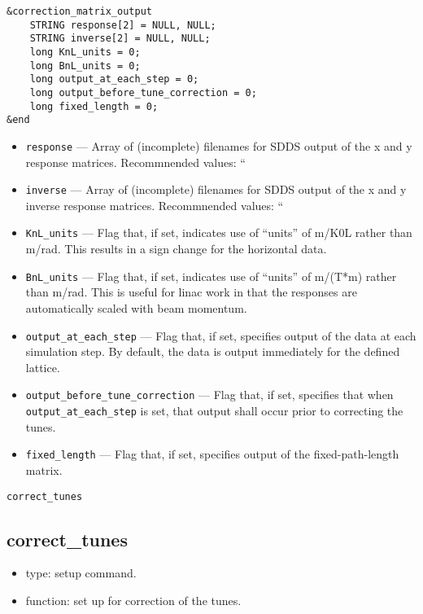 \documentclass[11pt]{article}
\begin{document}
\begin{verbatim}
&correction_matrix_output
    STRING response[2] = NULL, NULL;
    STRING inverse[2] = NULL, NULL;
    long KnL_units = 0;
    long BnL_units = 0;
    long output_at_each_step = 0;
    long output_before_tune_correction = 0;
    long fixed_length = 0;
&end
\end{verbatim}

\begin{itemize}
\item \verb|response| --- Array of (incomplete) filenames for SDDS output of the x and y response
matrices.  Recommnended values: ``%
\item \verb|inverse| --- Array of (incomplete) filenames for SDDS output of the x and y 
inverse response matrices. Recommnended values: ``%
\item \verb|KnL_units| --- Flag that, if set, indicates use of ``units'' of m/K0L rather than
m/rad.  This results in a sign change for the horizontal data.
\item \verb|BnL_units| --- Flag that, if set, indicates use of ``units'' of m/(T*m) rather than
m/rad.  This is useful for linac work in that the responses are automatically scaled with 
beam momentum.
\item \verb|output_at_each_step| --- Flag that, if set, specifies output of the data at
each simulation step.  By default, the data is output immediately for the defined lattice.
\item \verb|output_before_tune_correction| --- Flag that, if set, specifies that when 
\verb|output_at_each_step| is set, that output shall occur prior to correcting the tunes.
\item \verb|fixed_length| --- Flag that, if set, specifies output of the fixed-path-length
matrix.
\end{itemize}

\begin{latexonly}
\newpage
\begin{center}{\Large\verb|correct_tunes|}\end{center}
\end{latexonly}
\subsection{correct\_tunes}

\begin{itemize}
\item type: setup command.
\item function: set up for correction of the tunes.
\end{itemize}
\end{document}
